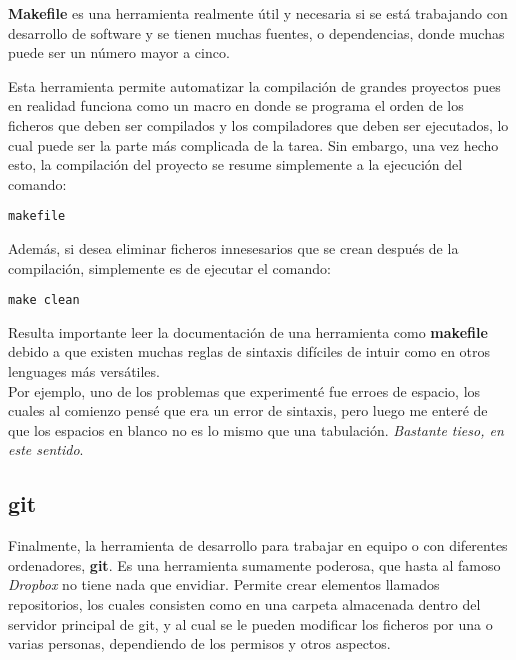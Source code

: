 \documentclass{article}
\begin{document}
\textbf{Makefile} es una herramienta realmente \' util y necesaria si se est\' a trabajando con desarrollo de software y se tienen muchas fuentes, o dependencias, donde muchas puede ser un n\' umero mayor a cinco. 

\bigskip

Esta herramienta permite automatizar la compilaci\' on de grandes proyectos pues en realidad funciona como un macro en donde se programa el orden de los ficheros que deben ser compilados y los compiladores que deben ser ejecutados, lo cual puede ser la parte m\' as complicada de la tarea. Sin embargo, una vez hecho esto, la compilaci\' on del proyecto se resume simplemente a la ejecuci\' on del comando:

\begin{verbatim}
makefile
\end{verbatim}

Adem\' as, si desea eliminar ficheros innesesarios que se crean despu\' es de la 
compilaci\' on, simplemente es de ejecutar el comando:

\begin{verbatim}
make clean
\end{verbatim}



Resulta importante leer la documentaci\' on de una herramienta como \textbf{makefile} debido a que existen muchas reglas de sintaxis dif\' iciles de intuir como en otros lenguages m\' as vers\' atiles.\\

Por ejemplo, uno de los problemas que experiment\' e fue erroes de espacio, los cuales al comienzo pens\' e que era un error de sintaxis, pero luego me enter\' e de que los espacios en blanco no es lo mismo que una tabulaci\' on. \textit{Bastante tieso, en este sentido}.

\subsection*{git}

Finalmente, la herramienta de desarrollo para trabajar en equipo o con diferentes ordenadores, \textbf{git}. Es una herramienta sumamente poderosa, que hasta al famoso \textit{Dropbox} no tiene nada que envidiar. Permite crear elementos llamados repositorios, los cuales consisten como en una carpeta almacenada dentro del servidor principal de git, y al cual se le pueden modificar los ficheros por una o varias personas, dependiendo de los permisos y otros aspectos.
\end{document}
